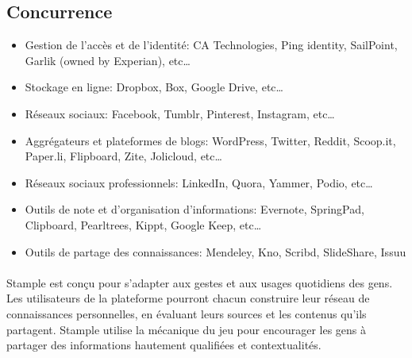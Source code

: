\documentclass[12pt,oneside,a4paper]{article}
\begin{document}
\subsection{Concurrence}
\begin{itemize}
\item Gestion de l'accès et de l'identité: CA Technologies, Ping identity, SailPoint, Garlik (owned by Experian), etc…
\item Stockage en ligne: Dropbox, Box, Google Drive, etc…
\item Réseaux sociaux: Facebook, Tumblr, Pinterest, Instagram, etc…
\item Aggrégateurs et plateformes de blogs: WordPress, Twitter, Reddit, Scoop.it, Paper.li, Flipboard, Zite, Jolicloud, etc…
\item Réseaux sociaux professionnels: LinkedIn, Quora, Yammer, Podio, etc…
\item Outils de note et d'organisation d'informations: Evernote, SpringPad, Clipboard, Pearltrees, Kippt, Google Keep, etc…
\item Outils de partage des connaissances: Mendeley, Kno, Scribd, SlideShare, Issuu

\end{itemize}
\paragraph{}
Stample est conçu pour s'adapter aux gestes et aux usages quotidiens des gens. Les utilisateurs de la plateforme pourront chacun construire leur réseau de connaissances personnelles, en évaluant leurs sources et les contenus qu'ils partagent.
Stample utilise la mécanique du jeu pour encourager les gens à partager des informations hautement qualifiées et contextualités.
\end{document}
